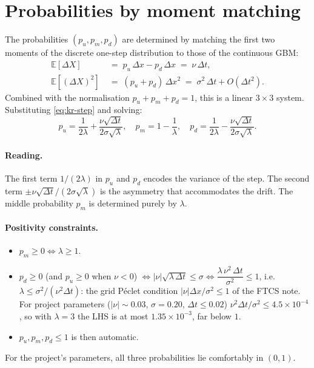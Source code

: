 \documentclass[11pt,a4paper]{article}
\begin{document}
\section{Probabilities by moment matching}

The probabilities $(p_u, p_m, p_d)$ are determined by matching
the first two moments of the discrete one-step distribution to those
of the continuous GBM:
\begin{align}
\mathbb{E}[\Delta X] \;&=\; p_u\,\Delta x - p_d\,\Delta x \;=\; \nu\,\Delta t,
\label{eq:mom1}\\
\mathbb{E}[(\Delta X)^2] \;&=\; (p_u + p_d)\,\Delta x^2 \;=\; \sigma^2\,\Delta t + O(\Delta t^2).
\label{eq:mom2}
\end{align}
Combined with the normalisation $p_u + p_m + p_d = 1$, this is a
linear $3 \times 3$ system. Substituting \eqref{eq:kr-step} and solving:
\begin{equation}
\boxed{\;\;
p_u = \frac{1}{2\lambda} + \frac{\nu\sqrt{\Delta t}}{2\sigma\sqrt{\lambda}},
\quad
p_m = 1 - \frac{1}{\lambda},
\quad
p_d = \frac{1}{2\lambda} - \frac{\nu\sqrt{\Delta t}}{2\sigma\sqrt{\lambda}}.
\;\;}
\label{eq:probs}
\end{equation}

\paragraph{Reading.} The first term $1/(2\lambda)$ in $p_u$ and $p_d$
encodes the variance of the step. The second term
$\pm\nu\sqrt{\Delta t}/(2\sigma\sqrt{\lambda})$ is the asymmetry that
accommodates the drift. The middle probability $p_m$ is determined
purely by $\lambda$.

\paragraph{Positivity constraints.}
\begin{itemize}[leftmargin=2em]
\item $p_m \ge 0 \iff \lambda \ge 1$.
\item $p_d \ge 0$ (and $p_u \ge 0$ when $\nu < 0$) $\iff |\nu|\sqrt{\lambda\,\Delta t} \le \sigma \iff \dfrac{\lambda\,\nu^2\,\Delta t}{\sigma^2} \le 1$, i.e.\ $\lambda \le \sigma^2/(\nu^2\Delta t)$: the grid Péclet condition $|\nu|\Delta x/\sigma^2 \le 1$ of the FTCS note. For project parameters ($|\nu| \sim 0.03$, $\sigma = 0.20$, $\Delta t \le 0.02$) $\nu^2\Delta t/\sigma^2 \le 4.5\times 10^{-4}$, so with $\lambda = 3$ the LHS is at most $1.35\times 10^{-3}$, far below $1$.
\item $p_u, p_m, p_d \le 1$ is then automatic.
\end{itemize}
For the project's parameters, all three probabilities lie comfortably in
$(0, 1)$.
\end{document}
